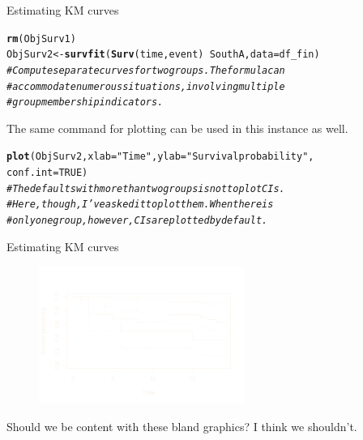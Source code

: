\documentclass[12pt,english,pdf,xcolor=dvipsnames,aspectratio=169]{beamer}\usepackage[]{graphicx}\usepackage[]{xcolor}
\makeatletter
\newcommand{\hlnum}[1]{\textcolor[rgb]{0.686,0.059,0.569}{#1}}%
\newcommand{\hlstr}[1]{\textcolor[rgb]{0.192,0.494,0.8}{#1}}%
\newcommand{\hlcom}[1]{\textcolor[rgb]{0.678,0.584,0.686}{\textit{#1}}}%
\newcommand{\hlopt}[1]{\textcolor[rgb]{0,0,0}{#1}}%
\newcommand{\hlstd}[1]{\textcolor[rgb]{0.345,0.345,0.345}{#1}}%
\newcommand{\hlkwb}[1]{\textcolor[rgb]{0.69,0.353,0.396}{#1}}%
\newcommand{\hlkwc}[1]{\textcolor[rgb]{0.333,0.667,0.333}{#1}}%
\newcommand{\hlkwd}[1]{\textcolor[rgb]{0.737,0.353,0.396}{\textbf{#1}}}%
\newenvironment{kframe}{%
 \def\at@end@of@kframe{}%
 \ifinner\ifhmode%
  \def\at@end@of@kframe{\end{minipage}}%
  \begin{minipage}{\columnwidth}%
 \fi\fi%
 \def\FrameCommand##1{\hskip\@totalleftmargin \hskip-\fboxsep
 \colorbox{shadecolor}{##1}\hskip-\fboxsep
     \hskip-\linewidth \hskip-\@totalleftmargin \hskip\columnwidth}%
 \MakeFramed {\advance\hsize-\width
   \@totalleftmargin\z@ \linewidth\hsize
   \@setminipage}}%
 {\par\unskip\endMakeFramed%
 \at@end@of@kframe}
\newenvironment{knitrout}{}{} %
\makeatother
\begin{document}
\begin{frame}[fragile]{Estimating KM curves}

\begin{knitrout}\scriptsize
{}\color{fgcolor}\begin{kframe}
\begin{alltt}
\hlkwd{rm}\hlstd{(ObjSurv1)}
\hlstd{ObjSurv2} \hlkwb{<-} \hlkwd{survfit}\hlstd{(}\hlkwd{Surv}\hlstd{(time, event)} \hlopt{~} \hlstd{SouthA,} \hlkwc{data} \hlstd{= df_fin)}
\hlcom{# Compute separate curves for two groups. The formula can}
\hlcom{# accommodate numerous situations, involving multiple}
\hlcom{# group membership indicators.}
\end{alltt}
\end{kframe}
\end{knitrout}

The same command for plotting can be used in this instance as well.\bigskip



\begin{knitrout}\scriptsize
{}\color{fgcolor}\begin{kframe}
\begin{alltt}
\hlkwd{plot}\hlstd{(ObjSurv2,} \hlkwc{xlab} \hlstd{=} \hlstr{"Time"}\hlstd{,} \hlkwc{ylab} \hlstd{=} \hlstr{"Survival probability"}\hlstd{,}
     \hlkwc{conf.int} \hlstd{=} \hlnum{TRUE}\hlstd{)}
\hlcom{# The defaults with more than two groups is not to plot CIs.}
\hlcom{# Here, though, I've asked it to plot them. When there is}
\hlcom{# only one group, however, CIs are plotted by default.}
\end{alltt}
\end{kframe}
\end{knitrout}

\end{frame}




\begin{frame}[fragile]{Estimating KM curves}

\begin{figure}[ht]
  \centering
  \includegraphics[width=0.6\textwidth]{../03-graphs/01-03.pdf}
\end{figure}

Should we be content with these bland graphics? I think we shouldn't.
\end{frame}
\end{document}
